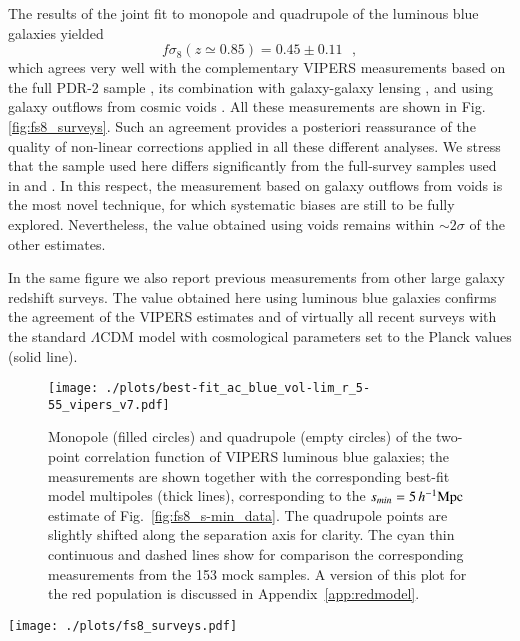 \documentclass[longauth]{aa}
\def\({\left(}
\def\){\right)}
\def\mhmpc{\,h^{-1}{\rm Mpc}}
\begin{document}
The results of the joint fit to monopole and quadrupole of the luminous blue galaxies yielded
	\begin{equation}
		f\sigma_8\(z\simeq0.85\) = 0.45\pm0.11 \,\,\,\, ,						\label{eq:fs8-data}
	\end{equation}
which agrees very well with the complementary VIPERS measurements based on the full PDR-2 sample \citep{pezzotta16}, its combination with galaxy-galaxy lensing \citep{delatorre16}, and using galaxy outflows from cosmic voids \citep{hawken16}.  All these measurements are shown in Fig. \ref{fig:fs8_surveys}. Such an agreement provides a posteriori reassurance of the quality of non-linear corrections applied in all these different analyses.  We stress that the sample used here differs significantly from the full-survey samples used in \citet{pezzotta16} and \citet{delatorre16}. In this respect, the measurement based on galaxy outflows from voids \citep{hawken16} is the most novel technique, for which systematic biases are still to be fully explored.  Nevertheless, the value obtained using voids remains within $\sim 2\sigma$ of the other estimates.

In the same figure we also report previous measurements from other large galaxy redshift surveys.  The value obtained here using luminous blue galaxies confirms the agreement of the VIPERS estimates and of virtually all recent surveys with the standard $\Lambda$CDM model with cosmological parameters set to the Planck values (solid line). 
\begin{figure}
	\centering
		\texttt{[image: ./plots/best-fit\_ac\_blue\_vol-lim\_r\_5-55\_vipers\_v7.pdf]}
		\caption{Monopole (filled circles) and quadrupole (empty circles) of the two-point correlation function of VIPERS luminous blue galaxies; the measurements are shown together with the corresponding best-fit model multipoles (thick lines), corresponding to the $s_{min}=5 \mhmpc$ estimate of Fig.~\ref{fig:fs8_s-min_data}. The quadrupole points are slightly shifted along the separation axis for clarity.  The cyan thin continuous and dashed lines show for comparison the corresponding measurements from the 153 mock samples. A version of this plot for the red population is discussed in Appendix~\ref{app:redmodel}.}\label{fig:best-fit_mps}
	\end{figure}
 \begin{figure*}
    	\centering
		\texttt{[image: ./plots/fs8\_surveys.pdf]}
		\caption{Estimate of the linear growth rate $f\sigma_8$ obtained here from the luminous blue galaxy sample (red circle),  compared to other VIPERS measurements using different techniques, together with those from other surveys. The black solid curve shows the predictions of General Relativity with a $\Lambda$CDM model with parameters set to Planck 2015 \citep{planck15} results and the shaded band corresponds to the related 1-$\sigma$ error.}\label{fig:fs8_surveys}
	\end{figure*}
\end{document}
